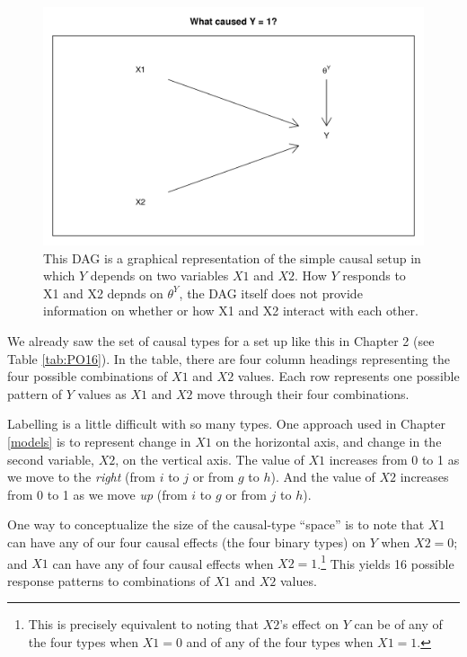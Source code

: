 \documentclass[12pt,]{book}
\let\rmarkdownfootnote\footnote%
\def\footnote{\protect\rmarkdownfootnote}
\begin{document}
\begin{figure}

{\centering \includegraphics[width=.5\textwidth]{ii_files/figure-latex/attribquery-1} 

}

\caption{\label{fig:attribquery} This DAG is a graphical representation of the simple causal setup in which $Y$ depends on two variables $X1$ and $X2$. How $Y$ responds to X1 and X2 depnds on $\theta^Y$, the DAG itself does not provide information on whether or how X1 and X2 interact with each other.}\label{fig:attribquery}
\end{figure}

We already saw the set of causal types for a set up like this in Chapter 2 (see Table \ref{tab:PO16}). In the table, there are four column headings representing the four possible combinations of \(X1\) and \(X2\) values. Each row represents one possible pattern of \(Y\) values as \(X1\) and \(X2\) move through their four combinations.

Labelling is a little difficult with so many types. One approach used in Chapter \ref{models} is to represent change in \(X1\) on the horizontal axis, and change in the second variable, \(X2\), on the vertical axis. The value of \(X1\) increases from 0 to 1 as we move to the \emph{right} (from \(i\) to \(j\) or from \(g\) to \(h\)). And the value of \(X2\) increases from 0 to 1 as we move \emph{up} (from \(i\) to \(g\) or from \(j\) to \(h\)).

One way to conceptualize the size of the causal-type ``space'' is to note that \(X1\) can have any of our four causal effects (the four binary types) on \(Y\) when \(X2=0\); and \(X1\) can have any of four causal effects when \(X2=1\).\footnote{This is precisely equivalent to noting that \(X2\)'s effect on \(Y\) can be of any of the four types when \(X1=0\) and of any of the four types when \(X1=1\).} This yields 16 possible response patterns to combinations of \(X1\) and \(X2\) values.
\end{document}
